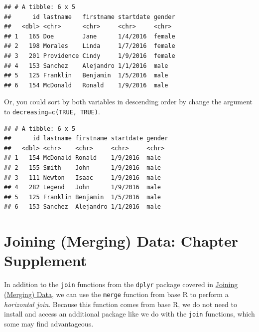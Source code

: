 \documentclass[]{book}
\newenvironment{Shaded}{\begin{snugshade}}{\end{snugshade}}
\newcommand{\KeywordTok}[1]{\textcolor[rgb]{0.13,0.29,0.53}{\textbf{#1}}}
\newcommand{\DataTypeTok}[1]{\textcolor[rgb]{0.13,0.29,0.53}{#1}}
\newcommand{\StringTok}[1]{\textcolor[rgb]{0.31,0.60,0.02}{#1}}
\newcommand{\CommentTok}[1]{\textcolor[rgb]{0.56,0.35,0.01}{\textit{#1}}}
\newcommand{\OtherTok}[1]{\textcolor[rgb]{0.56,0.35,0.01}{#1}}
\newcommand{\OperatorTok}[1]{\textcolor[rgb]{0.81,0.36,0.00}{\textbf{#1}}}
\newcommand{\NormalTok}[1]{#1}
\begin{document}
\begin{verbatim}
## # A tibble: 6 x 5
##      id lastname   firstname startdate gender
##   <dbl> <chr>      <chr>     <chr>     <chr> 
## 1   165 Doe        Jane      1/4/2016  female
## 2   198 Morales    Linda     1/7/2016  female
## 3   201 Providence Cindy     1/9/2016  female
## 4   153 Sanchez    Alejandro 1/1/2016  male  
## 5   125 Franklin   Benjamin  1/5/2016  male  
## 6   154 McDonald   Ronald    1/9/2016  male
\end{verbatim}

Or, you could sort by both variables in descending order by change the
argument to \texttt{decreasing=c(TRUE,\ TRUE)}.

\begin{Shaded}
\end{Shaded}

\begin{verbatim}
## # A tibble: 6 x 5
##      id lastname firstname startdate gender
##   <dbl> <chr>    <chr>     <chr>     <chr> 
## 1   154 McDonald Ronald    1/9/2016  male  
## 2   155 Smith    John      1/9/2016  male  
## 3   111 Newton   Isaac     1/9/2016  male  
## 4   282 Legend   John      1/9/2016  male  
## 5   125 Franklin Benjamin  1/5/2016  male  
## 6   153 Sanchez  Alejandro 1/1/2016  male
\end{verbatim}

\hypertarget{join_supplement}{\chapter*{Joining (Merging) Data: Chapter
Supplement}\label{join_supplement}}

In addition to the \texttt{join} functions from the \texttt{dplyr}
package covered in \protect\hyperlink{join}{Joining (Merging) Data}, we
can use the \texttt{merge} function from base R to perform a
\emph{horizontal join}. Because this function comes from base R, we do
not need to install and access an additional package like we do with the
\texttt{join} functions, which some may find advantageous.
\end{document}
